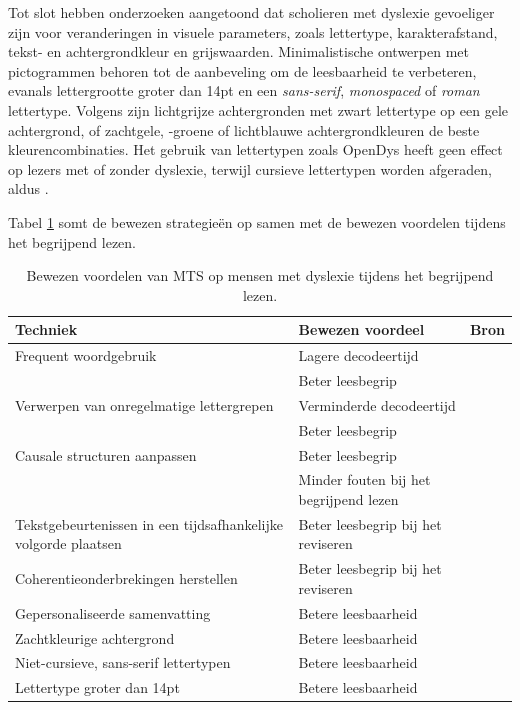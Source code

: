 \medspace

Tot slot hebben onderzoeken aangetoond dat scholieren met dyslexie gevoeliger zijn voor veranderingen in visuele parameters, zoals lettertype, karakterafstand, tekst- en achtergrondkleur en grijswaarden. Minimalistische ontwerpen met pictogrammen behoren tot de aanbeveling om de leesbaarheid te verbeteren, evanals lettergrootte groter dan 14pt en een \textit{sans-serif}, \textit{monospaced} of \textit{roman} lettertype. Volgens \textcite{Rello2015, Bezem2016, Rello2017} zijn lichtgrijze achtergronden met zwart lettertype op een gele achtergrond, of zachtgele, -groene of lichtblauwe achtergrondkleuren de beste kleurencombinaties. Het gebruik van lettertypen zoals OpenDys heeft geen effect op lezers met of zonder dyslexie, terwijl cursieve lettertypen worden afgeraden, aldus \textcite{Rello2013b, Rello2015}.

\medspace

Tabel \ref{table:benefits-mts} somt de bewezen strategieën op samen met de bewezen voordelen tijdens het begrijpend lezen.

\medspace

\begin{center}
	\begin{table}[H]
	\begin{tabular}{ | m{5cm} | m{5cm} | m{5cm} | } 
	\hline
	\textbf{Techniek} & \textbf{Bewezen voordeel} & \textbf{Bron}\\
	\hline
	Frequent woordgebruik & Lagere decodeertijd & \\
	& Beter leesbegrip & \\
	\hline	
	Verwerpen van onregelmatige lettergrepen & Verminderde decodeertijd & \\
	& Beter leesbegrip & \\	
	\hline
	Causale structuren aanpassen & Beter leesbegrip &\\
	& Minder fouten bij het begrijpend lezen & \\
	\hline	
	Tekstgebeurtenissen in een tijdsafhankelijke volgorde plaatsen & Beter leesbegrip bij het reviseren & \\
	\hline
	Coherentieonderbrekingen herstellen & Beter leesbegrip bij het reviseren & \\
	\hline
	Gepersonaliseerde samenvatting & Betere leesbaarheid & \\
	\hline
	Zachtkleurige achtergrond & Betere leesbaarheid & \\
	\hline
	Niet-cursieve, sans-serif lettertypen & Betere leesbaarheid & \\
	\hline 
	Lettertype groter dan 14pt & Betere leesbaarheid & \\
	\hline
	\end{tabular}
	\caption{Bewezen voordelen van MTS op mensen met dyslexie tijdens het begrijpend lezen.}
	\label{table:benefits-mts}
	\end{table}
\end{center}

